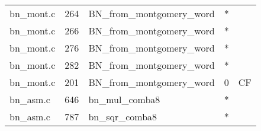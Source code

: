 \begin{table}
\begin{tabular}{lrlrr}
bn\_mont.c& 264&BN\_from\_montgomery\_word&*&\\
bn\_mont.c& 266&BN\_from\_montgomery\_word&*&\\
bn\_mont.c& 276&BN\_from\_montgomery\_word&*&\\
bn\_mont.c& 282&BN\_from\_montgomery\_word&*&\\
bn\_mont.c& 201&BN\_from\_montgomery\_word&0 &CF\\
bn\_asm.c& 646&bn\_mul\_comba8&*&\\
bn\_asm.c& 787&bn\_sqr\_comba8&*&\\
\hline
\end{tabular}
\renewcommand{\baselinestretch}{1.0}\selectfont
\end{table}
